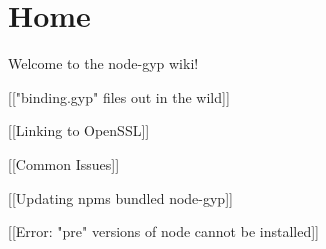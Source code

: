 \chapter{Home}
\hypertarget{md_backend_2node__modules_2node-gyp_2docs_2_home}{}\label{md_backend_2node__modules_2node-gyp_2docs_2_home}
Welcome to the node-\/gyp wiki!


\begin{DoxyItemize}
\item \mbox{[}\mbox{[}"{}binding.\+gyp"{} files out in the wild\mbox{]}\mbox{]}
\item \mbox{[}\mbox{[}Linking to Open\+SSL\mbox{]}\mbox{]}
\item \mbox{[}\mbox{[}Common Issues\mbox{]}\mbox{]}
\item \mbox{[}\mbox{[}Updating npm\textquotesingle{}s bundled node-\/gyp\mbox{]}\mbox{]}
\item \mbox{[}\mbox{[}Error\+: "{}pre"{} versions of node cannot be installed\mbox{]}\mbox{]} 
\end{DoxyItemize}